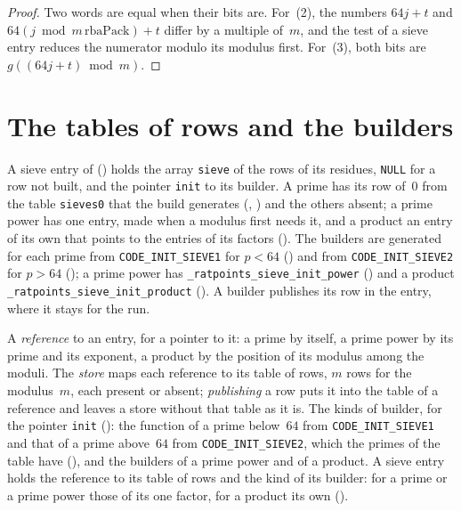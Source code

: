 \begin{proof}
  \leanok
  Two words are equal when their bits are. For~(2), the numbers $64 j + t$ and
  $64 (j \bmod m\,\mathrm{rbaPack}) + t$ differ by a multiple of~$m$, and the test of a sieve entry
  reduces the numerator modulo its modulus first. For~(3), both bits are $g((64 j + t) \bmod m)$.
\end{proof}

\section{The tables of rows and the builders}\label{sec:rowBuilders}

A sieve entry of \ratpoints{} () holds the array \verb|sieve| of the
rows of its residues, \verb|NULL| for a row not built, and the pointer \verb|init| to its builder.
A prime has its row of~$0$ from the table \verb|sieves0| that the build generates
(, ) and the others
absent; a prime power has one entry, made when a modulus first needs it, and a product an entry of
its own that points to the entries of its factors (). The
builders are generated for each prime from \verb|CODE_INIT_SIEVE1| for $p < 64$
() and from \verb|CODE_INIT_SIEVE2| for $p > 64$
(); a prime power has \verb|_ratpoints_sieve_init_power|
() and a product \verb|_ratpoints_sieve_init_product|
(). A builder publishes its row in the entry, where it stays for the run.

\begin{definition}\label{def:rowStore}
  \leanok
  A \emph{reference} to an entry, for a pointer to it: a prime by itself, a prime power by its
  prime and its exponent, a product by the position of its modulus among the moduli. The
  \emph{store} maps each reference to its table of rows, $m$ rows for the modulus~$m$, each present
  or absent; \emph{publishing} a row puts it into the table of a reference and leaves a store
  without that table as it is. The kinds of builder, for the pointer \verb|init|
  (): the function of a prime below~$64$ from
  \verb|CODE_INIT_SIEVE1| and that of a prime above~$64$ from \verb|CODE_INIT_SIEVE2|, which the
  primes of the table have (), and the builders of a prime power
  and of a product. A sieve entry holds the reference to its table of rows and the kind of its
  builder: for a prime or a prime power those of its one factor, for a product its own
  ().
\end{definition}


